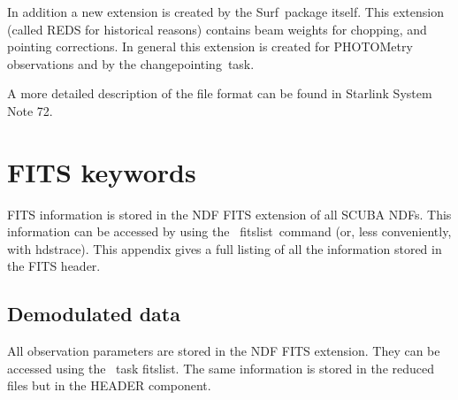 \documentclass[twoside,11pt]{article}
\newcommand{\scusoft}          {{\sc Surf}}
\newcommand{\Kappa}{\xref{{\sc{Kappa}}}{sun95}{}}
\newcommand{\task}[1]{{\sf #1}}
\newcommand{\chgpnt}{\htmlref{\task{change\_pointing}}{CHANGE_POINTING}}
\newcommand{\fitslist}{\xref{\task{fitslist}}{sun95}{FITSLIST}}
\newcommand{\hdstrace}{\xref{\task{hdstrace}}{sun102}{}}
\newcommand{\htmlref}[2]{#1}
\newcommand{\xref}[3]{#1}
\newcommand{\xlabel}[1]{}
\renewcommand{\_}{\texttt{\symbol{95}}}
\begin{document}
In addition a new extension is created by the \scusoft\ package itself. This
extension (called REDS for historical reasons) contains beam weights for
chopping, and pointing corrections. In general this extension is created for
PHOTOMetry observations and by the \chgpnt\ task.

A more detailed description of the file format can be found in
\xref{Starlink System Note 72}{ssn72}{}.


\section{\xlabel{fits}FITS keywords\label{fits}}

FITS information is stored in the NDF FITS extension of all SCUBA NDFs. This
information can be accessed by using the \Kappa\ \fitslist\ command (or,
less conveniently, with \hdstrace). This appendix gives a full listing
of all the information stored in the FITS header.

\subsection{Demodulated data}

All observation parameters are stored in the NDF FITS extension. They can be
accessed using the \Kappa\ task \fitslist. The same information is
stored in the reduced files but in the HEADER component.
\end{document}
